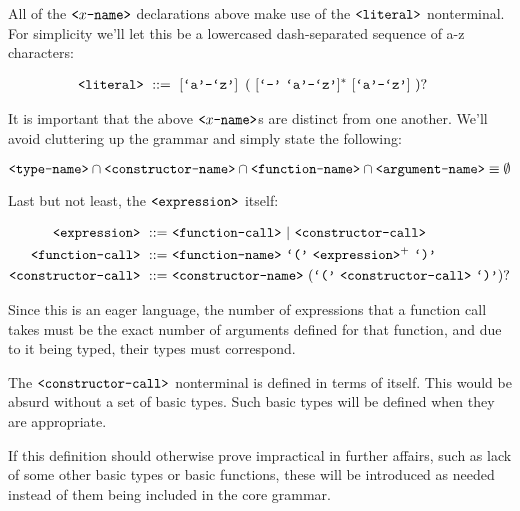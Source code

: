 All of the $\text{{\ttfamily<}}x\text{{\ttfamily-name>}}$ declarations above make use of the
$\text{{\ttfamily<literal>}}$ nonterminal. For simplicity we'll let this be a lowercased
dash-separated sequence of a-z characters:

\begin{align}
\text{{\ttfamily<literal>}}\ &::=\ [\text{{\ttfamily`a'}}\text{{\ttfamily-}}\text{{\ttfamily`z'}}]
\ \left (\ [\text{{\ttfamily`-'}}\ \text{{\ttfamily`a'}}\text{{\ttfamily-}}\text{{\ttfamily`z'}}]^*
\ [\text{{\ttfamily`a'}}\text{{\ttfamily-}}\text{{\ttfamily`z'}}]\ \right )?
\end{align}

It is important that the above $\text{{\ttfamily<}}x\text{{\ttfamily-name>}}$s are distinct
from one another. We'll avoid cluttering up the grammar and simply state the
following:

$$\text{{\ttfamily<type-name>}}\cap\text{{\ttfamily<constructor-name>}}\cap\text{{\ttfamily<function-name>}}
\cap\text{{\ttfamily<argument-name>}}\equiv\emptyset$$

Last but not least, the $\text{{\ttfamily<expression>}}$ itself:

\begin{align}
\nonterm{expression}\ ::=&\ \nonterm{function-call}\ |\ \nonterm{constructor-call}\\
\nonterm{function-call}\ ::=&\ \nonterm{function-name}\ \term{(}
\ \nonterm{expression}^+\ \term{)}\\
\nonterm{constructor-call}\ ::=&\ \nonterm{constructor-name}
\ (\term{(}\ \nonterm{constructor-call}\ \term{)})?
\end{align}

Since this is an eager language, the number of expressions that a function call
takes must be the exact number of arguments defined for that function, and due
to it being typed, their types must correspond.

The $\text{{\ttfamily<constructor-call>}}$ nonterminal is defined in terms of itself.
This would be absurd without a set of basic types. Such basic types will be
defined when they are appropriate.

If this definition should otherwise prove impractical in further affairs, such
as lack of some other basic types or basic functions, these will be introduced
as needed instead of them being included in the core grammar.
